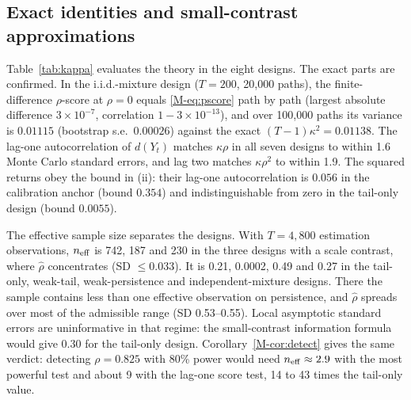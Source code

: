 \documentclass[11pt,a4paper]{article}
\theoremstyle{plain}
\theoremstyle{remark}
\begin{document}
\subsection{Exact identities and small-contrast approximations}
Table~\ref{tab:kappa} evaluates the theory in the eight designs. The exact parts are confirmed. In the i.i.d.-mixture design ($T=200$, 20{,}000 paths), the finite-difference $\rho$-score at $\rho=0$ equals \eqref{M-eq:pscore} path by path (largest absolute difference $3\times10^{-7}$, correlation $1-3\times10^{-13}$), and over 100{,}000 paths its variance is $0.01115$ (bootstrap s.e.\ $0.00026$) against the exact $(T-1)\kappa^2=0.01138$. The lag-one autocorrelation of $d(Y_t)$ matches $\kappa\rho$ in all seven designs to within 1.6 Monte Carlo standard errors, and lag two matches $\kappa\rho^2$ to within 1.9. The squared returns obey the bound in (ii): their lag-one autocorrelation is $0.056$ in the calibration anchor (bound $0.354$) and indistinguishable from zero in the tail-only design (bound $0.0055$).

The effective sample size separates the designs. With $T=4{,}800$ estimation observations, $n_{\rm eff}$ is 742, 187 and 230 in the three designs with a scale contrast, where $\hat\rho$ concentrates (SD $\le0.033$). It is 0.21, 0.0002, 0.49 and 0.27 in the tail-only, weak-tail, weak-persistence and independent-mixture designs. There the sample contains less than one effective observation on persistence, and $\hat\rho$ spreads over most of the admissible range (SD 0.53--0.55). Local asymptotic standard errors are uninformative in that regime: the small-contrast information formula would give 0.30 for the tail-only design. Corollary~\ref{M-cor:detect} gives the same verdict: detecting $\rho=0.825$ with 80\% power would need $n_{\rm eff}\approx2.9$ with the most powerful test and about 9 with the lag-one score test, 14 to 43 times the tail-only value.
\end{document}
